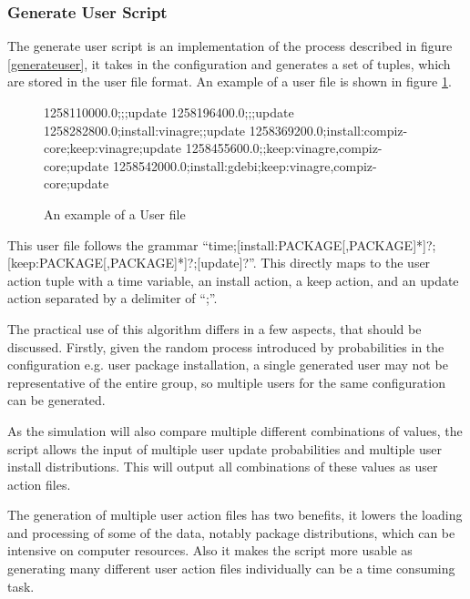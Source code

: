 \subsubsection{Generate User Script}
The generate user script is an implementation of the process described in figure \ref{generateuser}, 
it takes in the configuration and generates a set of tuples, which are stored in the user file format.
An example of a user file is shown in figure \ref{userfile}.

\begin{figure}[htp]
\begin{center}
1258110000.0;;;update
1258196400.0;;;update
1258282800.0;install:vinagre;;update
1258369200.0;install:compiz-core;keep:vinagre;update
1258455600.0;;keep:vinagre,compiz-core;update
1258542000.0;install:gdebi;keep:vinagre,compiz-core;update
  \caption[User File example]{An example of a User file}
  \label{userfile}
\end{center}
\end{figure}

This user file follows the grammar ``time;[install:PACKAGE[,PACKAGE]*]?;[keep:PACKAGE[,PACKAGE]*]?;[update]?''.
This directly maps to the user action tuple with a time variable, an install action, a keep action, and an update action separated by a delimiter of ``;''.

The practical use of this algorithm differs in a few aspects, that should be discussed.
Firstly, given the random process introduced by probabilities in the configuration e.g. user package installation,
a single generated user may not be representative of the entire group, so multiple users for the same configuration can be generated.

As the simulation will also compare multiple different combinations of values, the script allows the input of multiple user update probabilities and multiple user install distributions.
This will output all combinations of these values as user action files.

The generation of multiple user action files has two benefits, it lowers the loading and processing of some of the data, notably package distributions, which can be intensive on computer resources.
Also it makes the script more usable as generating many different user action files individually can be a time consuming task.

